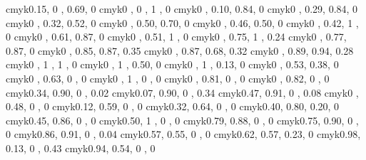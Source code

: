 \definecolor{col:greenyellow}   {cmyk}{0.15, 0   , 0.69, 0   }
\definecolor{col:yellow}        {cmyk}{0   , 0   , 1   , 0   }
\definecolor{col:goldenrod}     {cmyk}{0   , 0.10, 0.84, 0   }
\definecolor{col:dandelion}     {cmyk}{0   , 0.29, 0.84, 0   }
\definecolor{col:apricot}       {cmyk}{0   , 0.32, 0.52, 0   }
\definecolor{col:peach}         {cmyk}{0   , 0.50, 0.70, 0   }
\definecolor{col:melon}         {cmyk}{0   , 0.46, 0.50, 0   }
\definecolor{col:yelloworange}  {cmyk}{0   , 0.42, 1   , 0   }
\definecolor{col:orange}        {cmyk}{0   , 0.61, 0.87, 0   }
\definecolor{col:burntorange}   {cmyk}{0   , 0.51, 1   , 0   }
\definecolor{col:bittersweet}   {cmyk}{0   , 0.75, 1   , 0.24}
\definecolor{col:redorange}     {cmyk}{0   , 0.77, 0.87, 0   }
\definecolor{col:mahogany}      {cmyk}{0   , 0.85, 0.87, 0.35}
\definecolor{col:maroon}        {cmyk}{0   , 0.87, 0.68, 0.32}
\definecolor{col:brickred}      {cmyk}{0   , 0.89, 0.94, 0.28}
\definecolor{col:red}           {cmyk}{0   , 1   , 1   , 0   }
\definecolor{col:orangered}     {cmyk}{0   , 1   , 0.50, 0   }
\definecolor{col:rubinered}     {cmyk}{0   , 1   , 0.13, 0   }
\definecolor{col:salmon}        {cmyk}{0   , 0.53, 0.38, 0   }
\definecolor{col:carnationpink} {cmyk}{0   , 0.63, 0   , 0   }
\definecolor{col:magenta}       {cmyk}{0   , 1   , 0   , 0   }
\definecolor{col:violetred}     {cmyk}{0   , 0.81, 0   , 0   }
\definecolor{col:rhodamine}     {cmyk}{0   , 0.82, 0   , 0   }
\definecolor{col:mulberry}      {cmyk}{0.34, 0.90, 0   , 0.02}
\definecolor{col:redviolet}     {cmyk}{0.07, 0.90, 0   , 0.34}
\definecolor{col:fuchsia}       {cmyk}{0.47, 0.91, 0   , 0.08}
\definecolor{col:lavender}      {cmyk}{0   , 0.48, 0   , 0   }
\definecolor{col:thistle}       {cmyk}{0.12, 0.59, 0   , 0   }
\definecolor{col:orchid}        {cmyk}{0.32, 0.64, 0   , 0   }
\definecolor{col:darkorchid}    {cmyk}{0.40, 0.80, 0.20, 0   }
\definecolor{col:purple}        {cmyk}{0.45, 0.86, 0   , 0   }
\definecolor{col:plum}          {cmyk}{0.50, 1   , 0   , 0   }
\definecolor{col:violet}        {cmyk}{0.79, 0.88, 0   , 0   }
\definecolor{col:royalpurple}   {cmyk}{0.75, 0.90, 0   , 0   }
\definecolor{col:blueviolet}    {cmyk}{0.86, 0.91, 0   , 0.04}
\definecolor{col:periwinkle}    {cmyk}{0.57, 0.55, 0   , 0   }
\definecolor{col:cadetblue}     {cmyk}{0.62, 0.57, 0.23, 0   }
\definecolor{col:midnightblue}  {cmyk}{0.98, 0.13, 0   , 0.43}
\definecolor{col:navyblue}      {cmyk}{0.94, 0.54, 0   , 0   }
